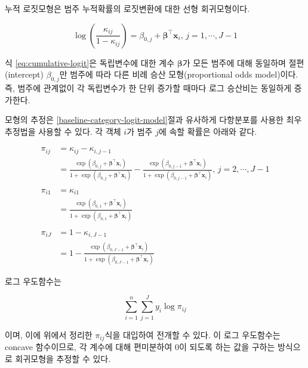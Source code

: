 \documentclass[
]{book}
\begin{document}
누적 로짓모형은 범주 누적확률의 로짓변환에 대한 선형 회귀모형이다.

\begin{equation}
\log \left( \frac{\kappa_{ij}}{1 - \kappa_{ij}} \right) = \beta_{0,j} + \boldsymbol\beta^\top \mathbf{x}_i, \, j = 1, \cdots, J - 1
\label{eq:cumulative-logit}
\end{equation}

식 \eqref{eq:cumulative-logit}은 독립변수에 대한 계수 \(\boldsymbol\beta\)가 모든 범주에 대해 동일하며 절편(intercept) \(\beta_{0,j}\)만 범주에 따라 다른 비례 승산 모형(proportional odds model)이다. 즉, 범주에 관계없이 각 독립변수가 한 단위 증가할 때마다 로그 승산비는 동일하게 증가한다.

모형의 추정은 \ref{baseline-category-logit-model}절과 유사하게 다항분포를 사용한 최우추정법을 사용할 수 있다. 각 객체 \(i\)가 범주 \(j\)에 속할 확률은 아래와 같다.

\begin{equation*}
\begin{split}
\pi_{ij} &= \kappa_{ij} - \kappa_{i,j-1}\\
&= \frac{\exp (\beta_{0,j} + \boldsymbol\beta^\top \mathbf{x}_i)}{1 + \exp (\beta_{0,j} + \boldsymbol\beta^\top \mathbf{x}_i)} - \frac{\exp (\beta_{0,j-1} + \boldsymbol\beta^\top \mathbf{x}_i)}{1 + \exp (\beta_{0,j-1} + \boldsymbol\beta^\top \mathbf{x}_i)}, \, j = 2, \cdots, J - 1\\
& \\
\pi_{i1} &= \kappa_{i1}\\
&= \frac{\exp (\beta_{0,1} + \boldsymbol\beta^\top \mathbf{x}_i)}{1 + \exp (\beta_{0,1} + \boldsymbol\beta^\top \mathbf{x}_i)}\\
& \\
\pi_{iJ} &= 1 - \kappa_{i,J-1}\\
&= 1 - \frac{\exp (\beta_{0,J-1} + \boldsymbol\beta^\top \mathbf{x}_i)}{1 + \exp (\beta_{0,J-1} + \boldsymbol\beta^\top \mathbf{x}_i)}
\end{split}
\label{eq:cumulative-logit-prob}
\end{equation*}

로그 우도함수는

\begin{equation*}
\sum_{i = 1}^{n} \sum_{j = 1}^{J} y_i \log \pi_{ij}
\end{equation*}

이며, 이에 위에서 정리한 \(\pi_{ij}\)식을 대입하여 전개할 수 있다. 이 로그 우도함수는 concave 함수이므로\citep{pratt1981concavity}, 각 계수에 대해 편미분하여 0이 되도록 하는 값을 구하는 방식으로 회귀모형을 추정할 수 있다.
\end{document}
